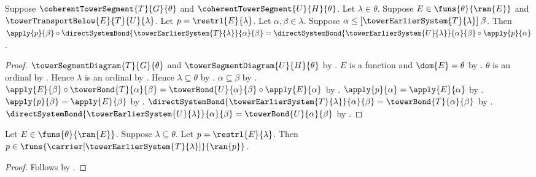 \begin{proposition}\label{tower_transport_restriction_square}
    Suppose $\coherentTowerSegment{T}{G}{\theta}$ and
        $\coherentTowerSegment{U}{H}{\theta}$.
    Let $\lambda\in\theta$.
    Suppose $E\in\funs{\theta}{\ran{E}}$ and
        $\towerTransportBelow{E}{T}{U}{\lambda}$.
    Let $p=\restrl{E}{\lambda}$.
    Let $\alpha,\beta\in\lambda$.
    Suppose $\alpha\mathrel{
        \leq[\towerEarlierSystem{T}{\lambda}]}\beta$.
    Then $\apply{p}{\beta}\circ
            \directSystemBond{\towerEarlierSystem{T}{\lambda}}
                {\alpha}{\beta}=
        \directSystemBond{\towerEarlierSystem{U}{\lambda}}
                {\alpha}{\beta}\circ\apply{p}{\alpha}$.
\end{proposition}
\begin{proof}
    $\towerSegmentDiagram{T}{G}{\theta}$ and
        $\towerSegmentDiagram{U}{H}{\theta}$ by
        .
    $E$ is a function and $\dom{E}=\theta$ by
        .
    $\theta$ is an ordinal by
        .
    Hence $\lambda$ is an ordinal by
        .
    Hence $\lambda\subseteq\theta$ by
        .
    $\alpha\subseteq\beta$ by
        .
    $\apply{E}{\beta}\circ\towerBond{T}{\alpha}{\beta}=
        \towerBond{U}{\alpha}{\beta}\circ\apply{E}{\alpha}$ by
        .
    $\apply{p}{\alpha}=\apply{E}{\alpha}$ by
        .
    $\apply{p}{\beta}=\apply{E}{\beta}$ by
        .
    $\directSystemBond{\towerEarlierSystem{T}{\lambda}}
            {\alpha}{\beta}=\towerBond{T}{\alpha}{\beta}$ by
        .
    $\directSystemBond{\towerEarlierSystem{U}{\lambda}}
            {\alpha}{\beta}=\towerBond{U}{\alpha}{\beta}$ by
        .
\end{proof}

\begin{proposition}\label{tower_transport_restriction_system_type}
    Let $E\in\funs{\theta}{\ran{E}}$.
    Suppose $\lambda\subseteq\theta$.
    Let $p=\restrl{E}{\lambda}$.
    Then $p\in\funs{
        \carrier[\towerEarlierSystem{T}{\lambda}]}{\ran{p}}$.
\end{proposition}
\begin{proof}
    Follows by
        .
\end{proof}

